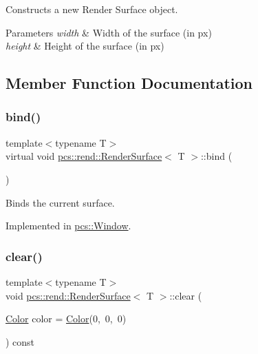 Constructs a new Render Surface object. 


\begin{DoxyParams}{Parameters}
{\em width} & Width of the surface (in px) \\
\hline
{\em height} & Height of the surface (in px) \\
\hline
\end{DoxyParams}


\subsection{Member Function Documentation}
\mbox{\label{classpcs_1_1rend_1_1RenderSurface_a79c0b291ed5a7b901fe4233bf8b376f2}} 
\subsubsection{\texorpdfstring{bind()}{bind()}}
{\footnotesize\ttfamily template$<$typename T$>$ \\
virtual void \hyperlink{classpcs_1_1rend_1_1RenderSurface}{pcs\+::rend\+::\+Render\+Surface}$<$ T $>$\+::bind (\begin{DoxyParamCaption}{ }\end{DoxyParamCaption})\hspace{0.3cm}{\ttfamily [pure virtual]}}



Binds the current surface. 



Implemented in \hyperlink{classpcs_1_1Window_aa6e00bee6910b3146481dee7aab69cfb}{pcs\+::\+Window}.

\mbox{\label{classpcs_1_1rend_1_1RenderSurface_ac875e478b7cbf438aa541f31fba6b750}} 
\subsubsection{\texorpdfstring{clear()}{clear()}}
{\footnotesize\ttfamily template$<$typename T$>$ \\
void \hyperlink{classpcs_1_1rend_1_1RenderSurface}{pcs\+::rend\+::\+Render\+Surface}$<$ T $>$\+::clear (\begin{DoxyParamCaption}\item[{\hyperlink{structpcs_1_1Color}{Color}}]{color = {\ttfamily \hyperlink{structpcs_1_1Color}{Color}(0,~0,~0)} }\end{DoxyParamCaption}) const\hspace{0.3cm}{\ttfamily [inline]}}




